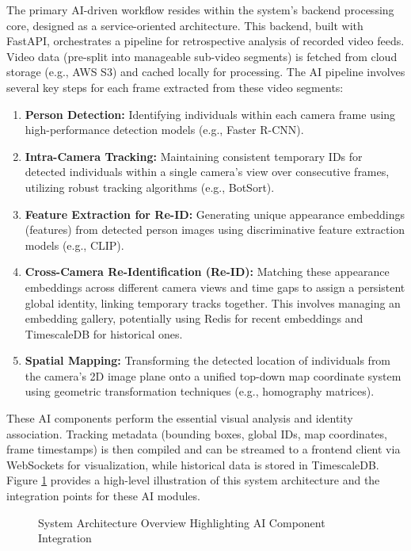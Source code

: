 The primary AI-driven workflow resides within the system's backend processing core, designed as a service-oriented architecture. This backend, built with FastAPI, orchestrates a pipeline for retrospective analysis of recorded video feeds. Video data (pre-split into manageable sub-video segments) is fetched from cloud storage (e.g., AWS S3) and cached locally for processing. The AI pipeline involves several key steps for each frame extracted from these video segments:
\begin{enumerate}
    \item \textbf{Person Detection:} Identifying individuals within each camera frame using high-performance detection models (e.g., Faster R-CNN).
    \item \textbf{Intra-Camera Tracking:} Maintaining consistent temporary IDs for detected individuals within a single camera's view over consecutive frames, utilizing robust tracking algorithms (e.g., BotSort).
    \item \textbf{Feature Extraction for Re-ID:} Generating unique appearance embeddings (features) from detected person images using discriminative feature extraction models (e.g., CLIP).
    \item \textbf{Cross-Camera Re-Identification (Re-ID):} Matching these appearance embeddings across different camera views and time gaps to assign a persistent global identity, linking temporary tracks together. This involves managing an embedding gallery, potentially using Redis for recent embeddings and TimescaleDB for historical ones.
    \item \textbf{Spatial Mapping:} Transforming the detected location of individuals from the camera's 2D image plane onto a unified top-down map coordinate system using geometric transformation techniques (e.g., homography matrices).
\end{enumerate}
These AI components perform the essential visual analysis and identity association. Tracking metadata (bounding boxes, global IDs, map coordinates, frame timestamps) is then compiled and can be streamed to a frontend client via WebSockets for visualization, while historical data is stored in TimescaleDB. Figure \ref{fig:system_architecture} provides a high-level illustration of this system architecture and the integration points for these AI modules.
\begin{figure}[!htb] %
    \centering
    \caption{System Architecture Overview Highlighting AI Component Integration}
    \label{fig:system_architecture}
\end{figure}

